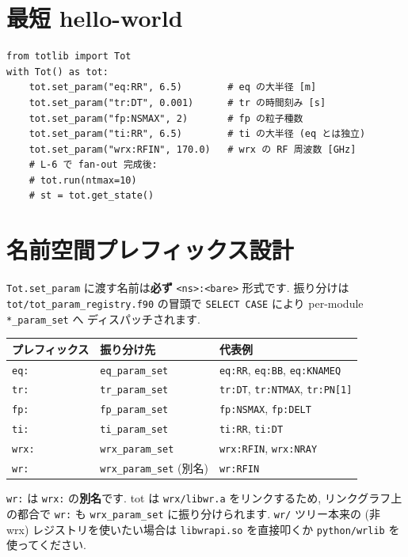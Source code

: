 \documentclass[11pt,a4paper]{report}
\begin{document}
\section{最短 hello-world}

\begin{lstlisting}[style=py,caption={\texttt{totlib} 最小例}]
from totlib import Tot
with Tot() as tot:
    tot.set_param("eq:RR", 6.5)        # eq の大半径 [m]
    tot.set_param("tr:DT", 0.001)      # tr の時間刻み [s]
    tot.set_param("fp:NSMAX", 2)       # fp の粒子種数
    tot.set_param("ti:RR", 6.5)        # ti の大半径 (eq とは独立)
    tot.set_param("wrx:RFIN", 170.0)   # wrx の RF 周波数 [GHz]
    # L-6 で fan-out 完成後:
    # tot.run(ntmax=10)
    # st = tot.get_state()
\end{lstlisting}

\section{名前空間プレフィックス設計}

\texttt{Tot.set\_param} に渡す名前は\textbf{必ず} \texttt{<ns>:<bare>}
形式です. 振り分けは \texttt{tot/tot\_param\_registry.f90} の冒頭で
\texttt{SELECT CASE} により per-module \texttt{*\_param\_set} へ
ディスパッチされます.

\begin{center}
\small
\begin{tabular}{@{}lll@{}}
\toprule
プレフィックス & 振り分け先 & 代表例 \\ \midrule
\texttt{eq:}  & \texttt{eq\_param\_set}  & \texttt{eq:RR}, \texttt{eq:BB}, \texttt{eq:KNAMEQ} \\
\texttt{tr:}  & \texttt{tr\_param\_set}  & \texttt{tr:DT}, \texttt{tr:NTMAX}, \texttt{tr:PN[1]} \\
\texttt{fp:}  & \texttt{fp\_param\_set}  & \texttt{fp:NSMAX}, \texttt{fp:DELT} \\
\texttt{ti:}  & \texttt{ti\_param\_set}  & \texttt{ti:RR}, \texttt{ti:DT} \\
\texttt{wrx:} & \texttt{wrx\_param\_set} & \texttt{wrx:RFIN}, \texttt{wrx:NRAY} \\
\texttt{wr:}  & \texttt{wrx\_param\_set} (別名) & \texttt{wr:RFIN} \\
\bottomrule
\end{tabular}
\end{center}

\begin{warn}
\texttt{wr:} は \texttt{wrx:} の\textbf{別名}です. tot は
\texttt{wrx/libwr.a} をリンクするため, リンクグラフ上の都合で
\texttt{wr:} も \texttt{wrx\_param\_set} に振り分けられます.
\texttt{wr/} ツリー本来の (非 wrx) レジストリを使いたい場合は
\texttt{libwrapi.so} を直接叩くか \texttt{python/wrlib} を
使ってください.
\end{warn}
\end{document}
